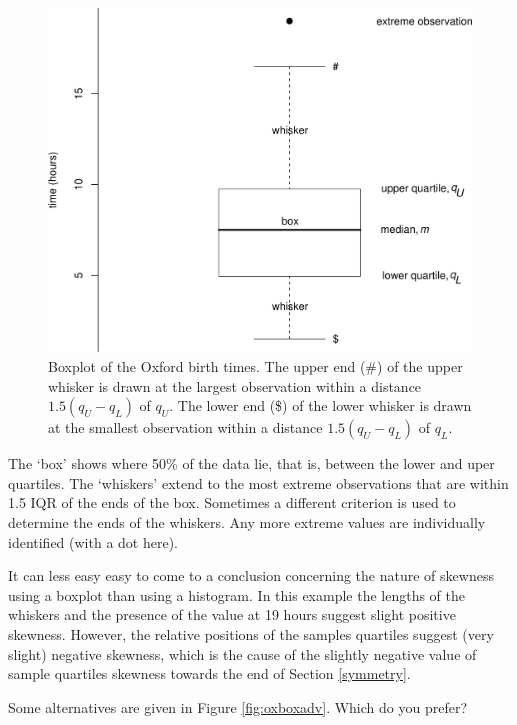 \documentclass[
  11pt,
  british,
  openany, a4paper]{book}
\begin{document}
\begin{figure}

{\centering \includegraphics[width=0.75\linewidth]{images/ox_box_basic} 

}

\caption{Boxplot of the Oxford birth times. The upper end (\#) of the upper whisker is drawn at the largest observation within a distance $1.5 (q_U-q_L)$ of $q_U$. The lower end (\$) of the lower whisker is drawn at the smallest observation within a distance $1.5 (q_U-q_L)$ of $q_L$.}\label{fig:oxboxbasic}
\end{figure}

The `box' shows where 50\% of the data lie, that is, between the lower and uper
quartiles. The `whiskers' extend to the most extreme observations that are within 1.5 IQR of the ends of the box. Sometimes a different criterion is used to determine the ends of the whiskers. Any more extreme values are individually identified (with a dot here).

It can less easy easy to come to a conclusion concerning the nature of skewness using a boxplot than using a histogram. In this example the lengths of the whiskers and the presence of the value at 19 hours suggest slight positive skewness. However, the relative positions of the samples quartiles suggest (very slight) negative skewness, which is the cause of the slightly negative value of sample quartiles skewness towards the end of Section \ref{symmetry}.

Some alternatives are given in Figure \ref{fig:oxboxadv}. Which do you prefer?
\end{document}
